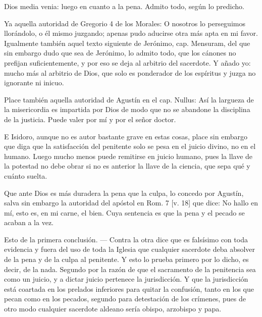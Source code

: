 Dios media venia: luego en cuanto a la pena. Admito todo, según lo predicho.

Ya aquella autoridad de Gregorio 4 de los Morales: O nosotros lo perseguimos llorándolo, o él mismo juzgando; apenas pudo aducirse otra más apta en mi favor. Igualmente también aquel texto siguiente de Jerónimo, cap. Mensuram, del que sin embargo dudo que sea de Jerónimo, lo admito todo, que los cánones no prefijan suficientemente, y por eso se deja al arbitrio del sacerdote. Y añado yo: mucho más al arbitrio de Dios, que solo es ponderador de los espíritus y juzga no ignorante ni inicuo.

Place también aquella autoridad de Agustín en el cap. Nullus: Así la largueza de la misericordia es impartida por Dios de modo que no se abandone la disciplina de la justicia. Puede valer por mí y por el señor doctor.

E Isidoro, aunque no es autor bastante grave en estas cosas, place sin embargo que diga que la satisfacción del penitente solo se pesa en el juicio divino, no en el humano. Luego mucho menos puede remitirse en juicio humano, pues la llave de la potestad no debe obrar si no es anterior la llave de la ciencia, que sepa qué y cuánto suelta.

Que ante Dios es más duradera la pena que la culpa, lo concedo por Agustín, salva sin embargo la autoridad del apóstol en Rom. 7 [v. 18] que dice: No hallo en mí, esto es, en mi carne, el bien. Cuya sentencia es que la pena y el pecado se acaban a la vez.

Esto de la primera conclusión. — Contra la otra dice que es falsísimo con toda evidencia y fuera del uso de toda la Iglesia que cualquier sacerdote deba absolver de la pena y de la culpa al penitente. Y esto lo prueba primero por lo dicho, es decir, de la nada. Segundo por la razón de que el sacramento de la penitencia sea como un juicio, y a dictar juicio pertenece la jurisdicción. Y que la jurisdicción está coartada en los prelados inferiores para quitar la confusión, tanto en los que pecan como en los pecados, segundo para detestación de los crímenes, pues de otro modo cualquier sacerdote aldeano sería obispo, arzobispo y papa.


